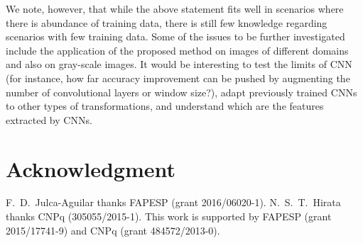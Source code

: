 \documentclass[conference]{IEEEtran}
\begin{document}
We note, however, that while the above statement fits well in
scenarios where there is abundance of training data, there is still
few knowledge regarding scenarios with few training data. Some of the
issues to be further investigated include the application of the
proposed method on images of different domains and also on gray-scale
images. It would be interesting to test the limits of CNN (for
instance, how far accuracy improvement can be pushed by augmenting the
number of convolutional layers or window size?), adapt previously
trained CNNs to other types of transformations, and understand which
are the features extracted by CNNs.

\section*{Acknowledgment}
F.~D.~Julca-Aguilar thanks FAPESP (grant
2016/06020-1). N.~S.~T.~Hirata thanks CNPq (305055/2015-1).
This work is supported by FAPESP (grant 2015/17741-9) and CNPq (grant
484572/2013-0).










\end{document}
